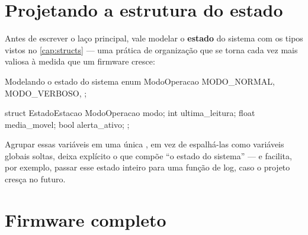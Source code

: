 \section{Projetando a estrutura do estado}

Antes de escrever o laço principal, vale modelar o \textbf{estado} do sistema com os tipos vistos no \cref{cap:structs} — uma prática de organização que se torna cada vez mais valiosa à medida que um firmware cresce:

\begin{codigoc}{Modelando o estado do sistema}
enum ModoOperacao {
    MODO_NORMAL,
    MODO_VERBOSO,
};

struct EstadoEstacao {
    ModoOperacao modo;
    int ultima_leitura;
    float media_movel;
    bool alerta_ativo;
};
\end{codigoc}

Agrupar essas variáveis em uma única , em vez de espalhá-las como variáveis globais soltas, deixa explícito o que compõe ``o estado do sistema'' — e facilita, por exemplo, passar esse estado inteiro para uma função de log, caso o projeto cresça no futuro.

\section{Firmware completo}

